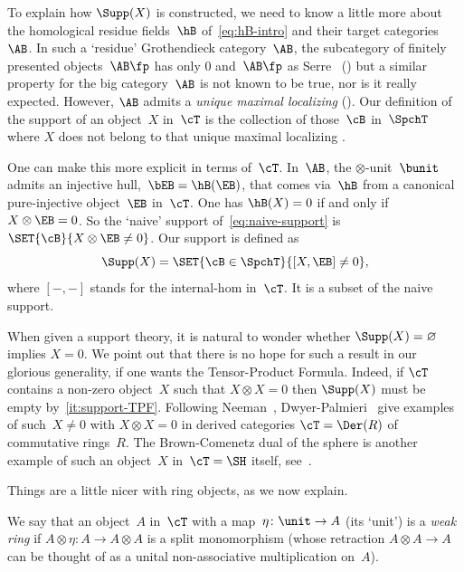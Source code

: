 To explain how $\Supp(X)$ is constructed, we need to know a little more about the homological residue fields~$\hB$ of~\eqref{eq:hB-intro} and their target categories~$\AB$. In such a `residue' Grothendieck category~$\AB$, the subcategory of finitely presented objects~$\AB\fp$ has only $0$ and~$\AB\fp$ as Serre \tensids\ () but a similar property for the big category~$\AB$ is not known to be true, nor is it really expected. However, $\AB$ admits a \emph{unique maximal localizing \tensid} (). Our definition of the support of an object~$X$ in~$\cT$ is the collection of those~$\cB$ in~$\SpchT$ where $X$ does not belong to that unique maximal localizing \tensid.

One can make this more explicit in terms of~$\cT$. In~$\AB$, the $\otimes$-unit~$\bunit$ admits an injective hull,~$\bEB=\hB(\EB)$, that comes via~$\hB$ from a canonical pure-injective object~$\EB$ in~$\cT$. One has $\hB(X)=0$ if and only if $X\otimes \EB=0$. So the `naive' support of~\eqref{eq:naive-support} is $\SET{\cB}{X\otimes\EB\neq0}$. Our support is defined as
\begin{equation}
\label{eq:Supp}
\Supp(X)=\SET{\cB\in\SpchT}{[X,\EB]\neq0},
\end{equation}
where $[-,-]$ stands for the internal-hom in~$\cT$. It is a subset of the naive support.

When given a support theory, it is natural to wonder whether $\Supp(X)=\varnothing$ implies $X=0$. We point out that there is no hope for such a result in our glorious generality, if one wants the Tensor-Product Formula. Indeed, if $\cT$ contains a non-zero object~$X$ such that $X\otimes X=0$ then $\Supp(X)$ must be empty by~\eqref{it:support-TPF}. Following Neeman~\cite{Neeman00}, Dwyer-Palmieri~\cite[Th.\,B]{DwyerPalmieri08} give examples of such~$X\neq0$ with $X\otimes X=0$ in derived categories $\cT=\Der(R)$ of commutative rings~$R$. The Brown-Comenetz dual of the sphere is another example of such an object~$X$ in~$\cT=\SH$ itself, see~\cite[\S7]{HoveyStrickland99}.

Things are a little nicer with ring objects, as we now explain.

\begin{Def}
\label{Def:weak-ring}
We say that an object~$A$ in~$\cT$ with a map~$\eta\colon \unit\to A$ (its `unit') is a \emph{weak ring} if $A\otimes\eta\colon A\to A\otimes A$ is a split monomorphism (whose retraction $A\otimes A\to A$ can be thought of as a unital non-associative multiplication on~$A$).
\end{Def}

